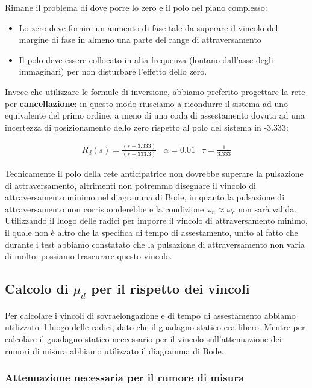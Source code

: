 \documentclass{article}
\begin{document}
Rimane il problema di dove porre lo zero e il polo nel piano complesso:
\begin{itemize}
    \item Lo zero deve fornire un aumento di fase tale da superare il vincolo del margine di fase in almeno una parte del range di attraversamento
    \item Il polo deve essere collocato in alta frequenza (lontano dall'asse degli immaginari) per non disturbare l'effetto dello zero.
\end{itemize}

Invece che utilizzare le formule di inversione, abbiamo preferito progettare la rete per \textbf{cancellazione}: in questo modo riusciamo a ricondurre il sistema ad uno equivalente del primo ordine, a meno di una coda di assestamento dovuta ad una incertezza di posizionamento dello zero rispetto al polo del sistema in -3.333:

$$
\begin{array}{lll}
    R_d(s) = \frac{(s+3.333)}{(s+333.3)} &\alpha=0.01 & \tau=\frac{1}{3.333}
\end{array}
$$

Tecnicamente il polo della rete anticipatrice non dovrebbe superare la pulsazione di attraversamento, altrimenti non potremmo disegnare il vincolo di attraversamento minimo nel diagramma di Bode, in quanto la pulsazione di attraversamento non corrisponderebbe e la condizione $\omega_n\approx\omega_c$ non sarà valida.\\

Utilizzando il luogo delle radici per imporre il vincolo di attraversamento minimo, il quale non è altro che la specifica di tempo di assestamento, unito al fatto che durante i test abbiamo constatato che la pulsazione di attraversamento non varia di molto, possiamo trascurare questo vincolo.

\subsection{Calcolo di $\mu_d$ per il rispetto dei vincoli}

Per calcolare i vincoli di sovraelongazione e di tempo di assestamento abbiamo utilizzato il luogo delle radici, dato che il guadagno statico era libero. Mentre per calcolare il guadagno statico neccessario per il vincolo sull'attenuazione dei rumori di misura abbiamo utilizzato il diagramma di Bode.

\subsubsection{Attenuazione necessaria per il rumore di misura}
\end{document}
